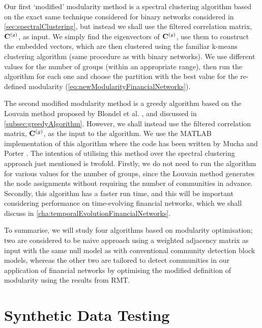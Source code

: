 Our first `modified' modularity method is a spectral clustering algorithm based on the exact same technique considered for binary networks considered in \cref{sec:spectralClustering}, but instead we shall use the filtered correlation matrix, $\mathbf C^{(g)}$, as input.
We simply find the eigenvectors of $\mathbf C^{(g)}$, use them to construct the embedded vectors, which are then clustered using the familiar k-means clustering algorithm (same procedure as with binary networks).
We use different values for the number of groups (within an appropriate range), then run the algorithm for each one and choose the partition with the best value for the re-defined modularity (\cref{eq:newModularityFinancialNetworks}).

The second modified modularity method is a greedy algorithm based on the Louvain method proposed by Blondel et al. \cite{BGL+08}, and discussed in \cref{subsec:greedyAlgorithm}.
However, we shall instead use the filtered correlation matrix, $\mathbf C^{(g)}$, as the input to the algorithm.
We use the MATLAB implementation of this algorithm where the code has been written by Mucha and Porter \cite{GenLou}.
The intention of utilising this method over the spectral clustering approach just mentioned is twofold.
Firstly, we do not need to run the algorithm for various values for the number of groups, since the Louvain method generates the node assignments without requiring the number of communities in advance.
Secondly, this algorithm has a faster run time, and this will be important considering performance on time-evolving financial networks, which we shall discuss in \cref{cha:temporalEvolutionFinancialNetworks}.

To summarise, we will study four algorithms based on modularity optimisation; two are considered to be naive approach using a weighted adjacency matrix as input with the same null model as with conventional community detection block models, whereas the other two are tailored to detect communities in our application of financial networks by optimising the modified definition of modularity using the results from RMT.


\section{Synthetic Data Testing}
\label{sec:syntheticDataTesting}

